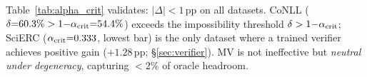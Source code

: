 \noindent Table~\ref{tab:alpha_crit} validates: $|\Delta| {<} 1$\,pp on all datasets.
CoNLL ($\delta{=}60.3\% > 1{-}\alpha_{\textup{crit}}{=}54.4\%$) exceeds the impossibility threshold $\delta > 1 {-} \alpha_{\textup{crit}}$; SciERC ($\alpha_{\textup{crit}}{=}0.333$, lowest bar) is the only dataset where a trained verifier achieves positive gain ($+1.28$\,pp; \S\ref{sec:verifier}).
MV is not ineffective but \textit{neutral under degeneracy}, capturing ${<}2\%$ of oracle headroom.
